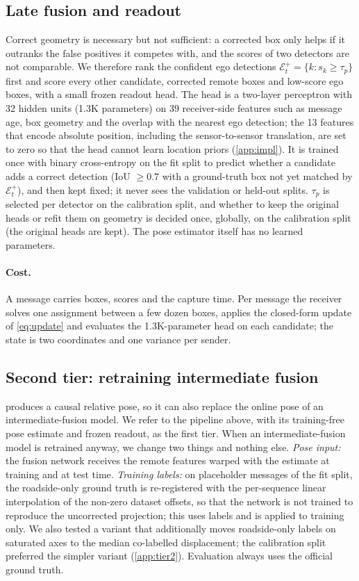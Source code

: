 \subsection{Late fusion and readout}
\label{sec:readout}
Correct geometry is necessary but not sufficient: a corrected box only helps if it outranks the false positives it competes with, and the scores of two detectors are not comparable.
We therefore rank the confident ego detections $\mathcal E^+_t=\{k:s_k\ge\tau_p\}$ first and score every other candidate, \ie corrected remote boxes and low-score ego boxes, with a small frozen readout head.
The head is a two-layer perceptron with 32 hidden units (1.3K parameters) on 39 receiver-side features such as message age, box geometry and the overlap with the nearest ego detection; the 13 features that encode absolute position, including the sensor-to-sensor translation, are set to zero so that the head cannot learn location priors (\cref{app:impl}).
It is trained once with binary cross-entropy on the fit split to predict whether a candidate adds a correct detection (IoU $\ge0.7$ with a ground-truth box not yet matched by $\mathcal E^+_t$), and then kept fixed; it never sees the validation or held-out splits.
$\tau_p$ is selected per detector on the calibration split, and whether to keep the original heads or refit them on \method geometry is decided once, globally, on the calibration split (the original heads are kept).
The pose estimator itself has no learned parameters.

\paragraph{Cost.}
A message carries boxes, scores and the capture time.
Per message the receiver solves one assignment between a few dozen boxes, applies the closed-form update of \cref{eq:update} and evaluates the 1.3K-parameter head on each candidate; the state is two coordinates and one variance per sender.

\subsection{Second tier: retraining intermediate fusion}
\label{sec:tier2}
\method produces a causal relative pose, so it can also replace the online pose of an intermediate-fusion model.
We refer to the pipeline above, with its training-free pose estimate and frozen readout, as the first tier.
When an intermediate-fusion model is retrained anyway, we change two things and nothing else.
\emph{Pose input:} the fusion network receives the remote features warped with the \method estimate at training and at test time.
\emph{Training labels:} on placeholder messages of the fit split, the roadside-only ground truth is re-registered with the per-sequence linear interpolation of the non-zero dataset offsets, so that the network is not trained to reproduce the uncorrected projection; this uses labels and is applied to training only.
We also tested a variant that additionally moves roadside-only labels on saturated axes to the median co-labelled displacement; the calibration split preferred the simpler variant (\cref{app:tier2}).
Evaluation always uses the official ground truth.

